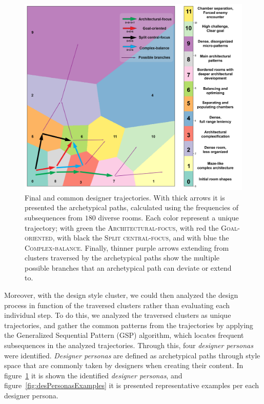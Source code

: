 \begin{figure}[t!]
\centerline{\includegraphics[width=\textwidth]{figures/DesPersonas-figs/resulting-paths-FINAL.png}}
\caption{Final and common designer trajectories. With thick arrows it is presented the archetypical paths, calculated using the frequencies of subsequences from $180$ diverse rooms. Each color represent a unique trajectory; with green the \textsc{Architectural-focus}, with red the \textsc{Goal-oriented}, with black the \textsc{Split central-focus}, and with blue the \textsc{Complex-balance}. Finally, thinner purple arrows extending from clusters traversed by the archetypical paths show the multiple possible branches that an archetypical path can deviate or extend to.} \label{fig:desPersonas}
\end{figure}

Moreover, with the design style cluster, we could then analyzed the design process in function of the traversed clusters rather than evaluating each individual step. To do this, we analyzed the traversed clusters as unique trajectories, and gather the common patterns from the trajectories by applying the Generalized Sequential Pattern (GSP) algorithm, which locates frequent subsequences in the analyzed trajectories. Through this, four \textit{designer personas} were identified. \textit{Designer personas} are defined as archetypical paths through style space that are commonly taken by designers when creating their content. In figure~\ref{fig:desPersonas} it is shown the identified \textit{designer personas}, and figure~\ref{fig:desPersonasExamples} it is presented representative examples per each designer persona.

